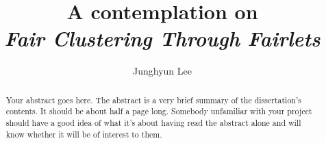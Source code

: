 \documentclass[a4paper, twoside]{report}
\title{A contemplation on \\
{\it Fair Clustering Through Fairlets}}
\author{Junghyun Lee}
\begin{document}


\begin{abstract}
Your abstract goes here. The abstract is a very brief summary of the dissertation's contents. It should be about half a page long. Somebody unfamiliar with your project should have a good idea of what it's about having read the abstract alone and will know whether it will be of interest to them.
\end{abstract}


\tableofcontents
\listoffigures
\listoftables










\end{document}
